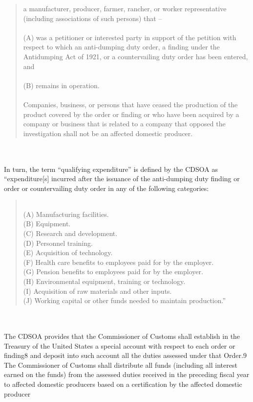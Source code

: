 \begin{tcolorbox}[breakable]
\blockquote{
    a manufacturer, producer, farmer, rancher, or worker representative (including
associations of such persons) that – \\\\
        (A) was a petitioner or interested party in support of the petition with respect
to which an anti-dumping duty order, a finding under the Antidumping Act of 1921,
or a countervailing duty order has been entered, and \\\\
\quad \quad (B) remains in operation. \\\\
Companies, business, or persons that have ceased the production of the product
covered by the order or finding or who have been acquired by a company or business
that is related to a company that opposed the investigation shall not be an affected
domestic producer.
}
\\\\
 \quad In turn, the term “qualifying expenditure” is defined by the CDSOA as “expenditure[s]
incurred after the issuance of the anti-dumping duty finding or order or countervailing duty order in
any of the following categories:
\blockquote{\\
(A) Manufacturing facilities.\\
(B) Equipment.\\
(C) Research and development.\\
(D) Personnel training.\\
(E) Acquisition of technology.\\
(F) Health care benefits to employees paid for by the employer.\\
(G) Pension benefits to employees paid for by the employer.\\
(H) Environmental equipment, training or technology.\\
(I) Acquisition of raw materials and other inputs.\\
(J) Working capital or other funds needed to maintain production.”
}
\\\\
 \quad The CDSOA provides that the Commissioner of Customs shall establish in the Treasury of
the United States a special account with respect to each order or finding8
 and deposit into such
account all the duties assessed under that Order.9
 The Commissioner of Customs shall distribute all
funds (including all interest earned on the funds) from the assessed duties received in the preceding
fiscal year to affected domestic producers based on a certification by the affected domestic producer

\end{tcolorbox}
